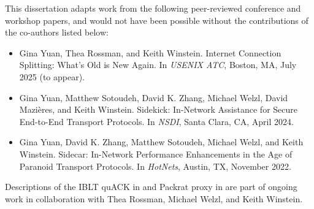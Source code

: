 
This dissertation adapts work from the following peer-reviewed conference and
workshop papers, and would not have been possible without the contributions of
the co-authors listed below:

\begin{itemize}
\item Gina Yuan, Thea Rossman, and Keith Winstein. Internet Connection Splitting:
What's Old is New Again. In \textit{USENIX ATC}, Boston, MA, July 2025
(to appear).
\item Gina Yuan, Matthew Sotoudeh, David K. Zhang, Michael Welzl, David Mazières, and
Keith Winstein. Sidekick: In-Network Assistance for Secure End-to-End Transport
Protocols. In \textit{NSDI}, Santa Clara, CA, April 2024.
\item Gina Yuan, David K. Zhang, Matthew Sotoudeh, Michael Welzl, and Keith Winstein.
Sidecar: In-Network Performance Enhancements in the Age of Paranoid Transport
Protocols. In \textit{HotNets}, Austin, TX, November 2022.
\end{itemize}

\noindent Descriptions of the IBLT quACK in  and Packrat proxy
 in  are part of ongoing work in collaboration with Thea
 Rossman, Michael Welzl, and Keith Winstein.
